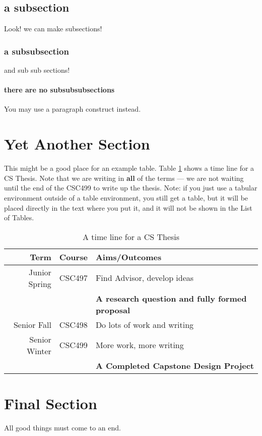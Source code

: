 \documentclass[final]{union-cs-thesis}
\begin{document}
\subsection{a subsection}

Look! we can make subsections!

\subsubsection{a subsubsection}

and sub sub sections!

\paragraph{there are no subsubsubsections}

You may use a paragraph construct instead.

\section{Yet Another Section}

This might be a good place for an example table.  Table \ref{tab:timeline}
shows a time line for a CS Thesis.  Note that we are writing in {\bf all}
of the terms --- we are not waiting until the end of the CSC499 to write up
the thesis.  Note: if you just use a tabular environment outside of a table
environment, you still get a table, but it will be placed directly in the
text where you put it, and it will not be shown in the List of Tables.

\begin{table}
\begin{center}
\begin{tabular}{r c l}
{\bf Term} &{\bf Course} &{\bf Aims/Outcomes} \\ \hline
Junior Spring & CSC497 & Find Advisor, develop ideas\\ 
&&{\bf A research question and fully formed proposal}\\ \hline
Senior Fall& CSC498 & Do lots of work and writing\\
Senior Winter & CSC499 & More work, more writing\\
&&{\bf A Completed Capstone Design
Project}\\ \hline
\end{tabular}
\end{center}
\caption{A time line for a CS Thesis\label{tab:timeline}}

\end{table}


\section{Final Section}

All good things must come to an end.

  

\end{document}
